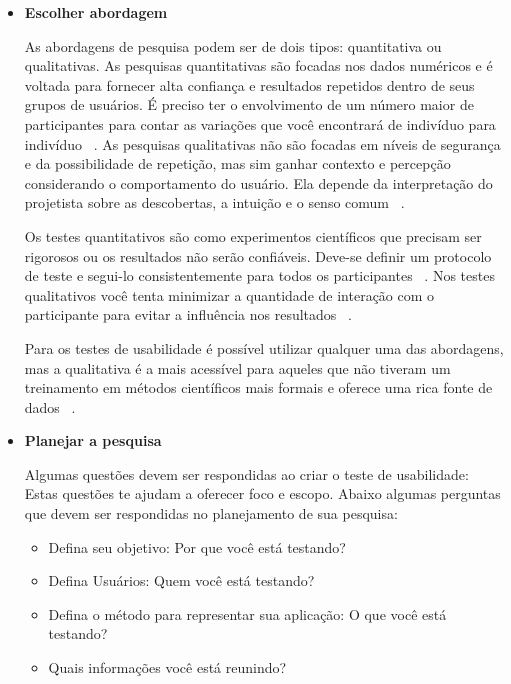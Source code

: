 \begin{itemize}

	\item \textbf{Escolher abordagem}

	As abordagens de pesquisa podem ser de dois tipos: quantitativa ou qualitativas. 
	As pesquisas quantitativas são focadas nos dados numéricos e é voltada para fornecer alta confiança e resultados repetidos dentro de seus grupos de usuários. É preciso ter o envolvimento de um número maior de participantes para contar as variações que você encontrará de indivíduo para indivíduo ~\cite{unger2009}.
	As pesquisas qualitativas não são focadas em níveis de segurança e da possibilidade de repetição, mas sim ganhar contexto e percepção considerando o comportamento do usuário. Ela depende da interpretação do projetista sobre as descobertas, a intuição e o senso comum ~\cite{unger2009}.

	Os testes quantitativos são como experimentos científicos que precisam ser rigorosos ou os resultados não serão confiáveis. Deve-se definir um protocolo de teste e segui-lo consistentemente para todos os participantes ~\cite{krug2010}.
	Nos testes qualitativos você tenta minimizar a quantidade de interação com o participante para evitar a influência nos resultados ~\cite{krug2010}.

	Para os testes de usabilidade é possível utilizar qualquer uma das abordagens, mas a qualitativa é a mais acessível para aqueles que não tiveram um treinamento em métodos científicos mais formais e oferece uma rica fonte de dados ~\cite{unger2009}.


	\item \textbf{Planejar a pesquisa}

	Algumas questões devem ser respondidas ao criar o teste de usabilidade: Estas questões te ajudam a oferecer foco e escopo. Abaixo algumas perguntas que devem ser respondidas no planejamento de sua pesquisa:

	\begin{itemize}
		\item Defina seu objetivo: Por que você está testando? 
	\item Defina Usuários: Quem você está testando? 
	\item Defina o método para representar sua aplicação: O que você está testando?
	\item Quais informações você está reunindo? 
	\end{itemize}
	
	


\end{itemize}

